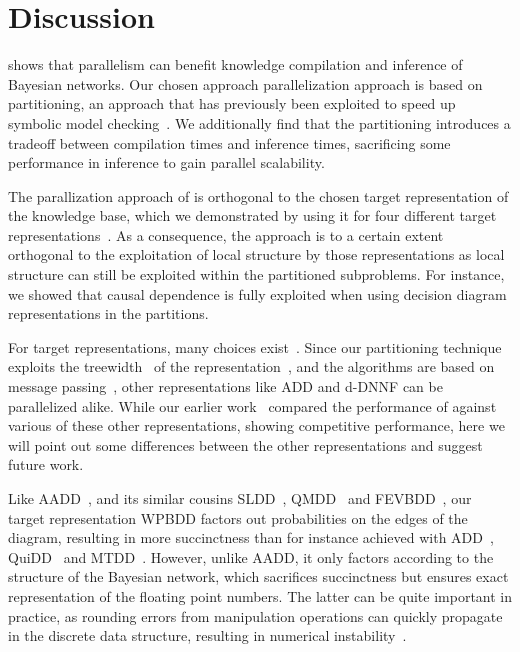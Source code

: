 
\section{Discussion}
\label{sec:conclusion}

\toolname shows that parallelism can benefit knowledge compilation and inference of Bayesian networks. Our chosen approach parallelization approach is based on partitioning, an approach that has previously been exploited to speed up symbolic model checking~\cite{narayan1996partitioned,sahoo2004partitioning,grumberg2006work}.  We additionally find that the partitioning introduces a tradeoff between compilation times and inference times, sacrificing some performance in inference to gain parallel scalability.




The parallization approach of \toolname is orthogonal to the chosen target representation of the knowledge base, which we demonstrated by using it for four different target representations~\cite{dal2018parallel}. As a consequence, the approach is to a certain extent orthogonal to the exploitation of local structure by those representations as local structure can still be exploited within the partitioned subproblems. For instance, we showed that causal dependence is fully exploited when using decision diagram representations in the partitions.


For target representations, many choices exist~\cite{darwiche2002knowledge,fargier2014knowledge,darwiche2001decomposable,darwiche2011sdd}. Since our partitioning technique exploits the treewidth~\cite{dechter1998bucket} of the representation~\cite[\S 5]{dal2021compositional}, and the algorithms are based on message passing~\cite[\S 4]{dal2021compositional}, other representations like ADD and d-DNNF can be parallelized alike. While our earlier work~\cite{dal2018parallel} compared the performance of \toolname against various of these other representations, showing competitive performance, here we will point out some differences between the other representations and suggest future work.


Like AADD~\cite{sanner2005affine}, and its similar cousins SLDD~\cite{wilson2005decision}, QMDD~\cite{miller2006qmdd} and FEVBDD~\cite{tafertshofer1997factored}, our target representation WPBDD factors out probabilities on the edges of the diagram, resulting in more succinctness than for instance achieved with ADD~\cite{bahar}, QuiDD~\cite{viamontes2003improving} and MTDD~\cite{Clarke2001}. However, unlike AADD, it only factors according to the structure of the Bayesian network, which sacrifices succinctness but ensures exact representation of the floating point numbers. The latter can be quite important in practice, as rounding errors from manipulation operations can quickly propagate in the discrete data structure, resulting in numerical instability~\cite{zulehner2019efficiently}.

